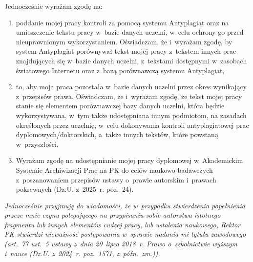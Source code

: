 Jednocześnie wyrażam zgodę na:
\begin{enumerate}
  \item poddanie mojej pracy kontroli za pomocą systemu Antyplagiat oraz na
    umieszczenie tekstu pracy w~bazie danych uczelni, w~celu ochrony go przed
    nieuprawnionym wykorzystaniem. Oświadczam, że
    i~wyrażam zgodę, by system Antyplagiat porównywał tekst mojej pracy
    z~tekstem innych prac znajdujących się w~bazie danych uczelni,
    z~tekstami dostępnymi w~zasobach światowego Internetu oraz z~bazą
    porównawczą systemu Antyplagiat,
  \item to, aby moja praca pozostała w~bazie danych uczelni przez okres
    wynikający z~przepisów prawa. Oświadczam, że
    i~wyrażam zgodę, że tekst mojej pracy stanie się elementem porównawczej
    bazy danych uczelni, która będzie wykorzystywana, w~tym także udostępniana
    innym podmiotom, na zasadach określonych przez uczelnię, w~celu
    dokonywania kontroli antyplagiatowej prac dyplomowych/doktorskich,
    a~także innych tekstów, które powstaną w~przyszłości.
    \miejscenapodpis
  \item Wyrażam zgodę na udostępnianie mojej pracy dyplomowej w~Akademickim
    Systemie Archiwizacji Prac na PK do celów naukowo-badawczych
    z~poszanowaniem przepisów ustawy o~prawie autorskim i~prawach pokrewnych
    (Dz.U. z~2025~r. poz.~24).
    \par\vspace{4pt}\hfill\makebox[6cm]{\wyborTakNie}
    \miejscenapodpis
\end{enumerate}

\vspace{4pt}
\textit{Jednocześnie przyjmuję do wiadomości, że w~przypadku stwierdzenia
popełnienia przeze mnie czynu polegającego na przypisaniu sobie autorstwa
istotnego fragmentu lub innych elementów cudzej pracy, lub ustalenia
naukowego, Rektor PK stwierdzi nieważność postępowania w~sprawie nadania mi
tytułu zawodowego (art.~77 ust.~5 ustawy z~dnia 20~lipca 2018~r. Prawo
o~szkolnictwie wyższym i~nauce (Dz.U. z~2024~r. poz.~1571, z~późn.~zm.)).}
\miejscenapodpis

\dopisekSkreslenia
\endgroup
\cleardoublepage
